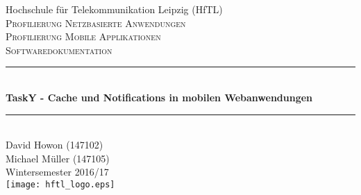 \begin{titlepage}

\newcommand{\HRule}{\rule{\linewidth}{0.5mm}} %

\center %
 

\LARGE Hochschule für Telekommunikation Leipzig (HfTL)\\[1.2cm] %
\textsc{\Large Profilierung Netzbasierte Anwendungen}\\[0.5cm] %
\textsc{\Large Profilierung Mobile Applikationen}\\[0.5cm] %
\textsc{\large Softwaredokumentation}\\[0.5cm] %


\HRule \\[0.4cm]
{ \LARGE \bfseries TaskY - Cache und Notifications in mobilen Webanwendungen}\\ %
\HRule \\[1cm]
 

\Large David Howon (147102)\\[1cm] 

\Large Michael Müller (147105)\\[1cm] 


{\large Wintersemester 2016/17}\\[2cm] %


\texttt{[image: hftl\_logo.eps]}\\[1cm] %
 

\vfill %

\end{titlepage}